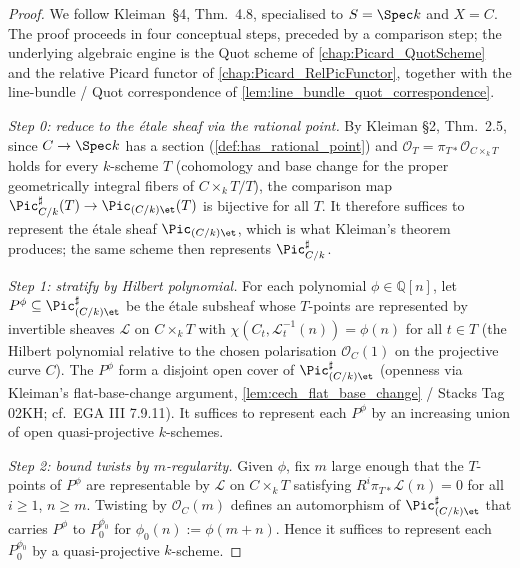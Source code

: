 \begin{proof}
  
  We follow Kleiman~\S 4, Thm.~4.8, specialised to \(S = \Spec k\) and
  \(X = C\). The proof proceeds in four conceptual steps, preceded by a
  comparison step; the underlying algebraic engine is the Quot scheme of
  \cref{chap:Picard_QuotScheme} and the relative Picard functor of
  \cref{chap:Picard_RelPicFunctor}, together with the line-bundle / Quot
  correspondence of \cref{lem:line_bundle_quot_correspondence}.

  \emph{Step 0: reduce to the \'etale sheaf via the rational point.}
  By Kleiman \S 2, Thm.~2.5, since \(C \to \Spec k\) has a section
  (\cref{def:has_rational_point}) and \(\mathcal O_T = \pi_{T*}
  \mathcal O_{C \times_k T}\) holds for every \(k\)-scheme \(T\) (cohomology
  and base change for the proper geometrically integral fibers of
  \(C\times_k T/T\)), the comparison map
  \(\Pic^\sharp_{C/k}(T) \to \Pic_{(C/k)\et}(T)\) is bijective for all
  \(T\). It therefore suffices to represent the \'etale sheaf
  \(\Pic_{(C/k)\et}\), which is what Kleiman's theorem produces; the same
  scheme then represents \(\Pic^\sharp_{C/k}\).

  \emph{Step 1: stratify by Hilbert polynomial.}
  For each polynomial \(\phi \in \mathbb{Q}[n]\), let \(P^\phi \subseteq
  \Pic^\sharp_{(C/k)\et}\) be the \'etale subsheaf whose \(T\)-points are
  represented by invertible sheaves \(\mathcal{L}\) on \(C \times_k T\) with
  \(\chi(C_t, \mathcal{L}_t^{-1}(n)) = \phi(n)\) for all \(t \in T\) (the
  Hilbert polynomial relative to the chosen polarisation
  \(\mathcal{O}_C(1)\) on the projective curve \(C\)). The \(P^\phi\) form a
  disjoint open cover of \(\Pic^\sharp_{(C/k)\et}\) (openness via Kleiman's
  flat-base-change argument, \cref{lem:cech_flat_base_change} / Stacks Tag 02KH;
  cf.\ EGA III 7.9.11). It suffices to
  represent each \(P^\phi\) by an increasing union of open quasi-projective
  \(k\)-schemes.

  \emph{Step 2: bound twists by \(m\)-regularity.}
  Given \(\phi\), fix \(m\) large enough that the \(T\)-points of \(P^\phi\) are
  representable by \(\mathcal{L}\) on \(C \times_k T\) satisfying
  \(R^i \pi_{T*} \mathcal{L}(n) = 0\) for all \(i \ge 1\), \(n \ge m\). Twisting
  by \(\mathcal{O}_C(m)\) defines an automorphism of \(\Pic^\sharp_{(C/k)\et}\)
  that carries \(P^\phi\) to \(P^{\phi_0}_0\) for \(\phi_0(n) := \phi(m + n)\).
  Hence it suffices to represent each \(P^{\phi_0}_0\) by a quasi-projective
  \(k\)-scheme.


\end{proof}
